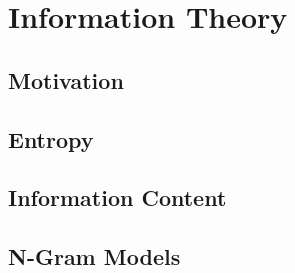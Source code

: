 \chapter{Information Theory}

\section{Motivation}

\section{Entropy}

\section{Information Content}

\section{N-Gram Models}
